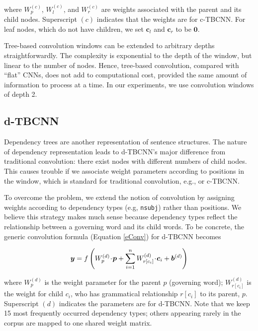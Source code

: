 \documentclass[11pt,a4paper]{article}
\begin{document}
\vspace{-.1cm}

\noindent where
$W_p^{(c)}$, $W_l^{(c)}$, and $W_r^{(c)}$ are weights associated with
the parent and its child nodes.
Superscript $(c)$ indicates that the weights are for c-TBCNN.
For leaf nodes, which do not have children,
we set $\bm c_l$ and $\bm c_r$ to be $\bm 0$.


Tree-based convolution windows can be extended to arbitrary depths straightforwardly.
The complexity is exponential to the depth of the window,
but linear to the number of nodes.
Hence, tree-based convolution, compared with ``flat'' CNNs,
does not add to computational cost, provided the same amount of information to process
at a time. In our experiments, we use convolution windows of depth 2.

\subsection{d-TBCNN}\label{ssdTBCNN}

Dependency trees are another representation of sentence structures.
The nature of dependency representation
leads to d-TBCNN's major difference from traditional convolution:
there exist nodes with different numbers of child nodes.
This causes trouble if we associate weight parameters according to
positions in the window, which is standard for traditional convolution, e.g.,
 or c-TBCNN.

To overcome the problem, we extend the notion of convolution by
assigning weights according to dependency types
(e.g, \verb|nsubj|) rather than positions.
We believe this strategy makes much sense because dependency types \cite{dependencyparsing} 
reflect the relationship between a governing word and its child words.
To be concrete, the generic convolution formula (Equation \ref{eConv}) for d-TBCNN becomes


\vspace{-.5cm}
$$\bm y = f\left(W^{(d)}_p\!\cdot\!\textsl{}\bm p+\sum_{i=1}^n W^{(d)}_{r[c_i]}\!\cdot\!\bm c_i+\bm b^{(d)}\right)$$

\vspace{-.3cm}

\noindent where
$W^{(d)}_p$ is the weight parameter for the parent $ p$
(governing word);
$W^{(d)}_{r[c_i]}$ is the weight for child $c_i$,
who has grammatical relationship $r[c_i]$ to its parent, $p$. Superscript $(d)$ indicates the parameters are for d-TBCNN.
Note that we keep 15 most frequently occurred dependency types\textsl{};
others appearing rarely in the corpus are mapped to one shared weight matrix.
\end{document}
